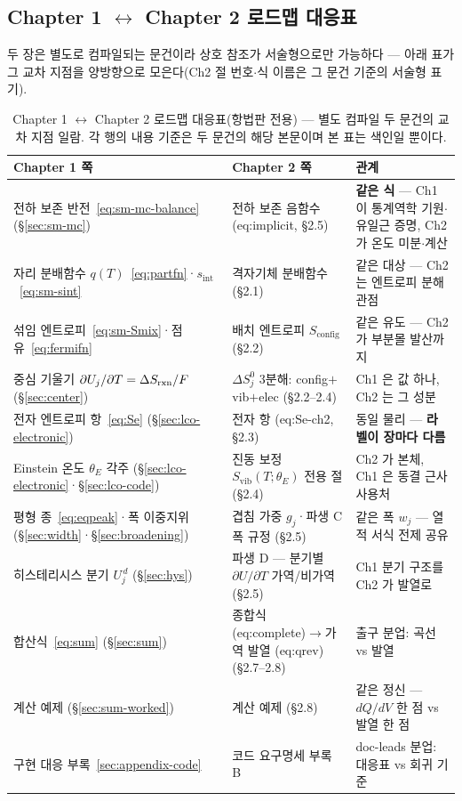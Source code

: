 \subsection{Chapter 1 $\leftrightarrow$ Chapter 2 로드맵 대응표}\label{ssec:nav-roadmap}
두 장은 별도로 컴파일되는 문건이라 상호 참조가 서술형으로만 가능하다 --- 아래 표가 그 교차 지점을
양방향으로 모은다(Ch2 절 번호$\cdot$식 이름은 그 문건 기준의 서술형 표기).

\begin{table}[h]
\centering
\small
\begin{tabular}{p{} p{} p{}}
\toprule
Chapter 1 쪽 & Chapter 2 쪽 & 관계 \\
\midrule
전하 보존 반전~\eqref{eq:sm-mc-balance} (\S\ref{sec:sm-mc}) & 전하 보존 음함수 (eq:implicit, \S2.5) & \textbf{같은 식} --- Ch1 이 통계역학 기원$\cdot$유일근 증명, Ch2 가 온도 미분$\cdot$계산 \\
자리 분배함수 $q(T)$~\eqref{eq:partfn}·$s_\mathrm{int}$~\eqref{eq:sm-sint} & 격자기체 분배함수 (\S2.1) & 같은 대상 --- Ch2 는 엔트로피 분해 관점 \\
섞임 엔트로피~\eqref{eq:sm-Smix}·점유~\eqref{eq:fermifn} & 배치 엔트로피 $S_\mathrm{config}$ (\S2.2) & 같은 유도 --- Ch2 가 부분몰 발산까지 \\
중심 기울기 $\partial U_j/\partial T=\Delta S_{\mathrm{rxn}}/F$ (\S\ref{sec:center}) & $\Delta S^0_j$ 3분해: config$+$vib$+$elec (\S2.2--2.4) & Ch1 은 값 하나, Ch2 는 그 성분 \\
전자 엔트로피 항~\eqref{eq:Se} (\S\ref{sec:lco-electronic}) & 전자 항 (eq:Se-ch2, \S2.3) & 동일 물리 --- \textbf{라벨이 장마다 다름} \\
Einstein 온도 $\theta_{E}$ 각주 (\S\ref{sec:lco-electronic}·\S\ref{sec:lco-code}) & 진동 보정 $S_{\mathrm{vib}}(T;\theta_E)$ 전용 절 (\S2.4) & Ch2 가 본체, Ch1 은 동결 근사 사용처 \\
평형 종~\eqref{eq:eqpeak}·폭 이중지위 (\S\ref{sec:width}·\S\ref{sec:broadening}) & 겹침 가중 $g_j$·파생 C 폭 규정 (\S2.5) & 같은 폭 $w_j$ --- 열적 서식 전제 공유 \\
히스테리시스 분기 $U_j^{\,d}$ (\S\ref{sec:hys}) & 파생 D --- 분기별 $\partial U/\partial T$ 가역/비가역 (\S2.5) & Ch1 분기 구조를 Ch2 가 발열로 \\
합산식~\eqref{eq:sum} (\S\ref{sec:sum}) & 종합식 (eq:complete)$\to$가역 발열 (eq:qrev) (\S2.7--2.8) & 출구 분업: 곡선 vs 발열 \\
계산 예제 (\S\ref{sec:sum-worked}) & 계산 예제 (\S2.8) & 같은 정신 --- $dQ/dV$ 한 점 vs 발열 한 점 \\
구현 대응 부록~\ref{sec:appendix-code} & 코드 요구명세 부록 B & doc-leads 분업: 대응표 vs 회귀 기준 \\
\bottomrule
\end{tabular}
\caption{Chapter 1 $\leftrightarrow$ Chapter 2 로드맵 대응표(항법판 전용) --- 별도 컴파일 두 문건의
교차 지점 일람. 각 행의 내용 기준은 두 문건의 해당 본문이며 본 표는 색인일 뿐이다.}
\label{tab:navroadmap}
\end{table}

